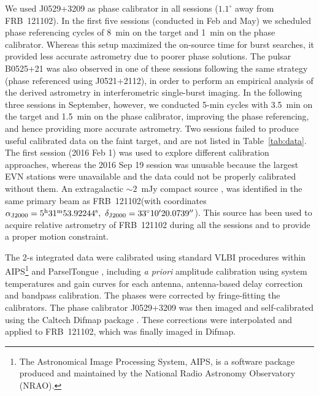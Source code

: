 \documentclass[twocolumn]{aastex61}
\newcommand{\frb}{FRB~121102\xspace}
\newcommand{\degree}{^{\circ}\xspace}
\begin{document}
We used J0529+3209 as phase calibrator in all sessions ($1.1^{\circ}$ away from \frb). In the first five sessions (conducted in Feb and May) we scheduled phase referencing cycles of 8~min on the target and 1~min on the phase calibrator. Whereas this setup maximized the on-source time for burst searches, it provided less accurate astrometry due to poorer phase solutions. The pulsar B0525+21 was also observed in one of these sessions following the same strategy (phase referenced using J0521+2112), in order to perform an empirical analysis of the derived astrometry in interferometric single-burst imaging.  In the following three sessions in September, however, we conducted 5-min cycles with 3.5~min on the target and 1.5~min on the phase calibrator, improving the phase referencing, and hence providing more accurate astrometry. Two sessions failed to produce useful calibrated data on the faint target, and are not listed in Table~\ref{tab:data}. The first session (2016 Feb 1) was used to explore different calibration approaches, whereas the 2016 Sep 19 session was unusable because the largest EVN stations were unavailable and the data could not be properly calibrated without them. An extragalactic $\sim2$~mJy compact source \citep[VLA2 in][]{kon15}, was identified in the same primary beam as \frb (with coordinates $\alpha_{\rm J2000} = 5^{\rm h}31^{\rm m}53.92244^{\rm s},\ \delta_{\rm J2000} = 33\degree 10^\prime20.0739^{\prime\prime}$).  This source has been used to acquire relative astrometry of \frb during all the sessions and to provide a proper motion constraint.

The 2-s integrated data were calibrated using standard VLBI procedures within AIPS\footnote{The Astronomical Image Processing System, AIPS, is a software package produced and maintained by the National Radio Astronomy Observatory (NRAO).} and ParselTongue \citep{kettenis2006}, including {\em a priori} amplitude calibration using system temperatures and gain curves for each antenna, antenna-based delay correction and bandpass calibration. The phases were corrected by fringe-fitting the calibrators. The phase calibrator J0529+3209 was then imaged and self-calibrated using the Caltech Difmap package \citep{shepherd1994}. These corrections were interpolated and applied to \frb, which was finally imaged in Difmap.
\end{document}
